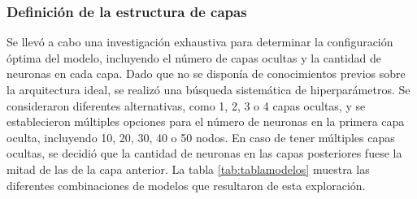 \subsubsection{Definición de la estructura de capas}
Se llevó a cabo una investigación exhaustiva para determinar la configuración óptima del modelo, incluyendo el 
número de capas ocultas y la cantidad de neuronas en cada capa. Dado que no se disponía de conocimientos previos 
sobre la arquitectura ideal, se realizó una búsqueda sistemática de hiperparámetros. Se consideraron diferentes 
alternativas, como 1, 2, 3 o 4 capas ocultas, y se establecieron múltiples opciones para el número de neuronas 
en la primera capa oculta, incluyendo 10, 20, 30, 40 o 50 nodos. En caso de tener múltiples capas ocultas, se 
decidió que la cantidad de neuronas en las capas posteriores fuese la mitad de las de la capa anterior. 
La tabla \ref{tab:tablamodelos} muestra las diferentes combinaciones de modelos que resultaron de esta exploración.


